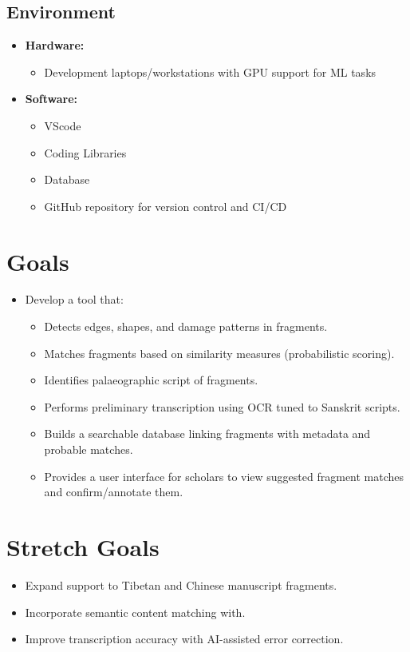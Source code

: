 \documentclass{article}
\begin{document}
\subsection{Environment}
\begin{itemize}
    \item \textbf{Hardware:}
    \begin{itemize} 
        \item Development laptops/workstations with GPU support for ML tasks
    \end{itemize}

    \item \textbf{Software:}
    \begin{itemize} 
        \item VScode
        \item Coding Libraries
        \item Database
        \item GitHub repository for version control and CI/CD
    \end{itemize}
\end{itemize}

\section{Goals}
\begin{itemize}
    \item Develop a tool that:
    \begin{itemize} 
        \item Detects edges, shapes, and damage patterns in fragments.
        \item Matches fragments based on similarity measures (probabilistic scoring).
        \item Identifies palaeographic script of fragments.
        \item Performs preliminary transcription using OCR tuned to Sanskrit scripts.
        \item Builds a searchable database linking fragments with metadata and probable matches.
        \item Provides a user interface for scholars to view suggested fragment matches and confirm/annotate them.
    \end{itemize}
\end{itemize}
\section{Stretch Goals}
\begin{itemize}
  \item Expand support to Tibetan and Chinese manuscript fragments.
  \item Incorporate semantic content matching with.
  \item Improve transcription accuracy with AI-assisted error correction.
\end{itemize}
\end{document}

